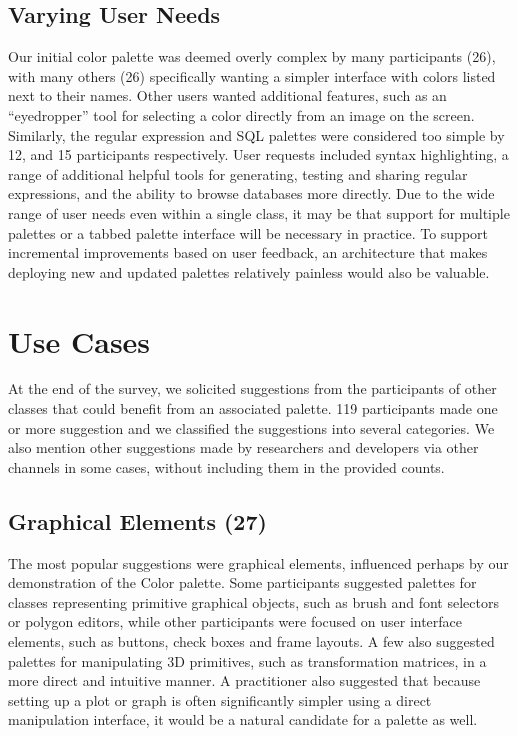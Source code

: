 \documentclass[10pt, conference, compsocconf]{IEEEtran}
\begin{document}
\subsection{Varying User Needs}

Our initial color palette was deemed overly complex by many participants (26), with many others (26) specifically wanting a simpler interface with colors listed next to their names. Other users wanted additional features, such as an ``eyedropper'' tool for selecting a color directly from an image on the screen. Similarly, the regular expression and SQL palettes were considered too simple by 12, and 15 participants respectively. User requests included syntax highlighting, a range of additional helpful tools for generating, testing and sharing regular expressions, and the ability to browse databases more directly. Due to the wide range of user needs even within a single class, it may be that support for multiple palettes or a tabbed palette interface will be necessary in practice. To support incremental improvements based on user feedback, an architecture that makes deploying new and updated palettes relatively painless would also be valuable.


\section{Use Cases}
At the end of the survey, we solicited suggestions from the participants of other classes that could benefit from an associated palette. 119 participants made one or more suggestion and we classified the suggestions into several categories. We also mention other suggestions made by researchers and developers via other channels in some cases, without including them in the provided counts.

\subsection{Graphical Elements (27)}
The most popular suggestions were graphical elements, influenced perhaps by our demonstration of the Color palette. Some participants suggested palettes for classes representing primitive graphical objects, such as brush and font selectors or polygon editors, while other participants were focused on user interface elements, such as buttons, check boxes and frame layouts. A few also suggested palettes for manipulating 3D primitives, such as transformation matrices, in a more direct and intuitive manner. A practitioner also suggested that because setting up a plot or graph is often significantly simpler using a direct manipulation interface, it would be a natural candidate for a palette as well.
\end{document}
